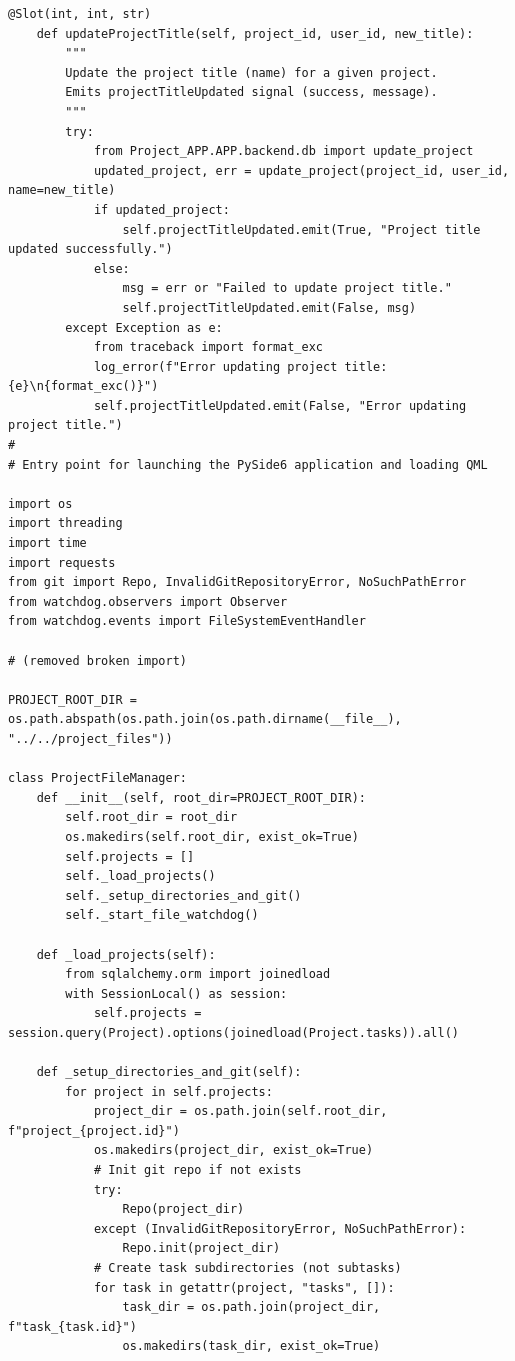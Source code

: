 \documentclass{report}
\begin{document}
\begin{lstlisting}[style=pythonstyle]
    @Slot(int, int, str)
    def updateProjectTitle(self, project_id, user_id, new_title):
        """
        Update the project title (name) for a given project.
        Emits projectTitleUpdated signal (success, message).
        """
        try:
            from Project_APP.APP.backend.db import update_project
            updated_project, err = update_project(project_id, user_id, name=new_title)
            if updated_project:
                self.projectTitleUpdated.emit(True, "Project title updated successfully.")
            else:
                msg = err or "Failed to update project title."
                self.projectTitleUpdated.emit(False, msg)
        except Exception as e:
            from traceback import format_exc
            log_error(f"Error updating project title: {e}\n{format_exc()}")
            self.projectTitleUpdated.emit(False, "Error updating project title.")
# 
# Entry point for launching the PySide6 application and loading QML

import os
import threading
import time
import requests
from git import Repo, InvalidGitRepositoryError, NoSuchPathError
from watchdog.observers import Observer
from watchdog.events import FileSystemEventHandler

# (removed broken import)

PROJECT_ROOT_DIR = os.path.abspath(os.path.join(os.path.dirname(__file__), "../../project_files"))

class ProjectFileManager:
    def __init__(self, root_dir=PROJECT_ROOT_DIR):
        self.root_dir = root_dir
        os.makedirs(self.root_dir, exist_ok=True)
        self.projects = []
        self._load_projects()
        self._setup_directories_and_git()
        self._start_file_watchdog()

    def _load_projects(self):
        from sqlalchemy.orm import joinedload
        with SessionLocal() as session:
            self.projects = session.query(Project).options(joinedload(Project.tasks)).all()

    def _setup_directories_and_git(self):
        for project in self.projects:
            project_dir = os.path.join(self.root_dir, f"project_{project.id}")
            os.makedirs(project_dir, exist_ok=True)
            # Init git repo if not exists
            try:
                Repo(project_dir)
            except (InvalidGitRepositoryError, NoSuchPathError):
                Repo.init(project_dir)
            # Create task subdirectories (not subtasks)
            for task in getattr(project, "tasks", []):
                task_dir = os.path.join(project_dir, f"task_{task.id}")
                os.makedirs(task_dir, exist_ok=True)


\end{lstlisting}
\end{document}
